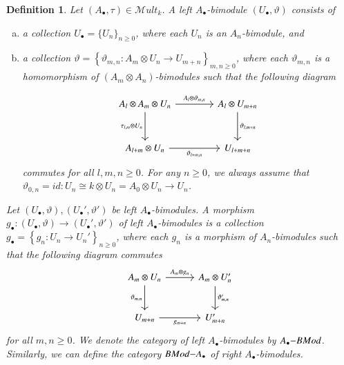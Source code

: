 \documentclass[10pt, colorlinks]{article}
\numberwithin{equation}{section} \DeclareMathSizes{2}{10}{12}{13}
\newtheorem{defn}[thm]{Definition}
\begin{document}
       
    \begin{defn}\label{D5.1kos}
            Let $(A_\bullet,\tau)\in \mathscr Mult_k$. A left $A_\bullet$-bimodule $(U_\bullet,\vartheta)$ consists of 
            \begin{enumerate}[(a)]
                \item a collection $U_\bullet=\{U_n\}_{n\geq 0}$, where each $U_n$ is an $A_n$-bimodule, and
                \item  a collection $\vartheta=\left\{\vartheta_{m,n}:A_m\otimes U_n\longrightarrow U_{m+n}\right\}_{m,n\geq 0}$, where each $\vartheta_{m,n}$ is a homomorphism of $(A_m\otimes A_n)$-bimodules such that the following diagram
                
               \begin{equation}\label{diag5.2p}
               \begin{tikzcd}[row sep=3em,  column sep=4em]
                  A_l\otimes A_m\otimes U_n\arrow[r, "A_l\otimes\vartheta_{m,n} "]
                   \arrow[d, "\tau_{l,m}\otimes U_n"']
                   & A_l\otimes U_{m+n}  \arrow[d, "\vartheta_{l,m+n}"] \\
                   A_{l+m} \otimes U_n\arrow[r, "\vartheta_{l+m,n}"']
                   &  U_{l+m+n}
               \end{tikzcd}
               \end{equation}
            commutes for all $l,m,n\geq 0$. For any $n\geq 0$, we always assume that $\vartheta_{0,n}=id:U_n\cong k\otimes U_n=A_0\otimes U_n\longrightarrow U_n $. 
            \end{enumerate}

            
            Let $(U_\bullet,\vartheta),(U_\bullet',\vartheta')$ be left $A_\bullet$-bimodules. A morphism $g_\bullet:(U_\bullet,\vartheta)\longrightarrow (U_\bullet',\vartheta')$ of left $A_\bullet$-bimodules is a collection $g_\bullet=\left\{g_n:U_n\longrightarrow U_n'\right\}_{n\geq 0}$, where each $g_n$ is a morphism of $A_n$-bimodules such that the following diagram  commutes
            \begin{equation}
            \begin{tikzcd}[row sep=2.5em,  column sep=3em]
                A_m \otimes U_n
                \arrow[r, "A_m \otimes g_{n}"]
                \arrow[d, "\vartheta_{m,n}"']
                &A_{m} \otimes U'_n
                \arrow[d, "\vartheta_{m,n}'"]\\
                U_{m+n} \arrow[r, "g_{m+n}"']
                &U'_{m+n}
            \end{tikzcd}
            \end{equation}
            for all $m,n\geq 0$. We denote the category of left $A_\bullet$-bimodules by $A_\bullet{\small{-}}BMod$. Similarly, we can define the category $BMod{\small{-}}A_\bullet$ of right $A_\bullet$-bimodules.
     \end{defn}
\end{document}
